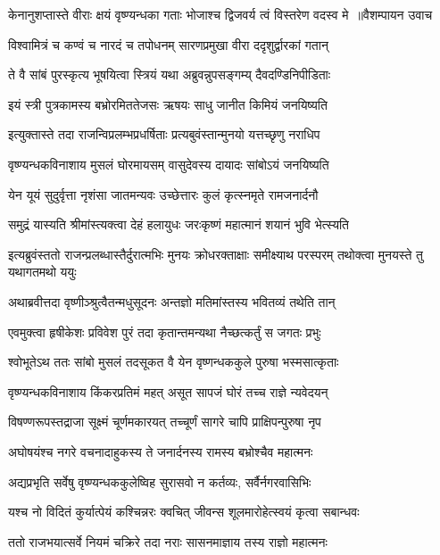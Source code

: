 \threelineshloka
{केनानुशप्तास्ते वीराः क्षयं वृष्ण्यन्धका गताः}
{भोजाश्च द्विजवर्य त्वं विस्तरेण वदस्व मे ॥वैशम्पायन उवाच}
{}


\twolineshloka
{विश्वामित्रं च कण्वं च नारदं च तपोधनम्}
{सारणप्रमुखा वीरा ददृशुर्द्वारकां गतान्}


\twolineshloka
{ते वै सांबं पुरस्कृत्य भूषयित्वा स्त्रियं यथा}
{अब्रुवन्नुपसङ्गम्य् दैवदण्डिनिपीडिताः}


\twolineshloka
{इयं स्त्री पुत्रकामस्य बभ्रोरमिततेजसः}
{ऋषयः साधु जानीत किमियं जनयिष्यति}


\twolineshloka
{इत्युक्तास्ते तदा राजन्विप्रलम्भप्रधर्षिताः}
{प्रत्यबुवंस्तान्मुनयो यत्तच्छृणु नराधिप}


\twolineshloka
{वृष्ण्यन्धकविनाशाय मुसलं घोरमायसम्}
{वासुदेवस्य दायादः सांबोऽयं जनयिष्यति}


\twolineshloka
{येन यूयं सुदुर्वृत्ता नृशंसा जातमन्यवः}
{उच्छेत्तारः कुलं कृत्स्नमृते रामजनार्दनौ}


\twolineshloka
{समुद्रं यास्यति श्रीमांस्त्यक्त्वा देहं हलायुधः}
{जरःकृष्णं महात्मानं शयानं भुवि भेत्स्यति}


\threelineshloka
{इत्यब्रुवंस्ततो राजन्प्रलब्धास्तैर्दुरात्मभिः}
{मुनयः क्रोधरक्ताक्षाः समीक्ष्याथ परस्परम्}
{तथोक्त्वा मुनयस्ते तु यथागतमथो ययुः}


\twolineshloka
{अथाब्रवीत्तदा वृष्णीञ्श्रुत्वैतन्मधुसूदनः}
{अन्तज्ञो मतिमांस्तस्य भवितव्यं तथेति तान्}


\twolineshloka
{एवमुक्त्वा हृषीकेशः प्रविवेश पुरं तदा}
{कृतान्तमन्यथा नैच्छत्कर्तुं स जगतः प्रभुः}


\twolineshloka
{श्वोभूतेऽथ ततः सांबो मुसलं तदसूकत वै}
{येन वृष्णन्धककुले पुरुषा भस्मसात्कृताः}


\twolineshloka
{वृष्ण्यन्धकविनाशाय किंकरप्रतिमं महत्}
{असूत सापजं घोरं तच्च राज्ञे न्यवेदयन्}


\twolineshloka
{विषण्णरूपस्तद्राजा सूक्ष्मं चूर्णमकारयत्}
{तच्चूर्णं सागरे चापि प्राक्षिपन्पुरुषा नृप}


\twolineshloka
{अघोषयंश्च नगरे वचनादाहुकस्य ते}
{जनार्दनस्य रामस्य बभ्रोश्चैव महात्मनः}


\twolineshloka
{अद्यप्रभृति सर्वेषु वृष्ण्यन्धककुलेष्विह}
{सुरासवो न कर्तव्यः, सर्वैर्नगरवासिभिः}


\twolineshloka
{यश्च नो विदितं कुर्यात्पेयं कश्चिन्नरः क्वचित्}
{जीवन्स शूलमारोहेत्स्वयं कृत्वा सबान्धवः}


\twolineshloka
{ततो राजभयात्सर्वे नियमं चक्रिरे तदा}
{नराः सासनमाज्ञाय तस्य राज्ञो महात्मनः}


